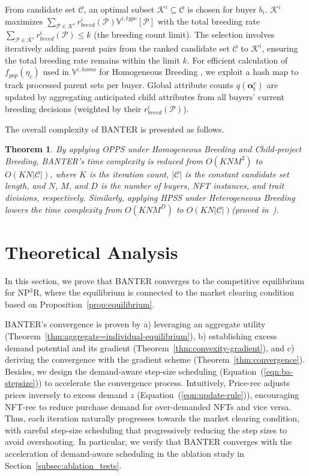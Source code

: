 \documentclass[conference]{IEEEtran}
\theoremstyle{plain}
\newtheorem{theorem}{Theorem}
\begin{document}
    From candidate set $\mathcal{C}$, an optimal subset $\mathcal{K}^i \subseteq \mathcal{C}$ is chosen for buyer $b_i$. $\mathcal{K}^i$ maximizes $\sum_{\mathcal{P}\in \mathcal{K}^i} r_{breed}^i(\mathcal{P})\mathbb{V}^{i, type}\left[\mathcal{P}\right]$ with the total breeding rate $\sum_{\mathcal{P}\in \mathcal{K}^i}r_{breed}^i(\mathcal{P}) \leq k$ (the breeding count limit). The selection involves iteratively adding parent pairs from the ranked candidate set $\mathcal{C}$ to $\mathcal{K}^i$, ensuring the total breeding rate remains within the limit $k$. For efficient calculation of $f_{pop}(\eta_c)$ used in $\mathbb{V}^{i, homo}$ for Homogeneous Breeding , we exploit a hash map to track processed parent sets per buyer. Global attribute counts $q(\bm{\alpha}^c_t)$ are updated by aggregating anticipated child attributes from all buyers' current breeding decisions (weighted by their $r_{breed}^i(\mathcal{P})$).

    The overall complexity of BANTER is presented as follows.

\begin{theorem}
    \label{thm:time-complexity}
        By applying OPPS under Homogeneous Breeding and Child-project Breeding, BANTER's time complexity is reduced from $O(KNM^2)$ to $O(KN|\mathcal{C}|)$, where $K$ is the iteration count, $|\mathcal{C}|$ is the constant candidate set length, and $N$, $M$, and $D$ is the number of buyers, NFT instances, and trait divisions, respectively. Similarly, applying HPSS under Heterogeneous Breeding lowers the time complexity from $O(KNM^D)$ to $O(KN|\mathcal{C}|)$(proved in~\cite{supplementary}). 

\end{theorem}

\section{Theoretical Analysis}
\label{sec:theory}
In this section, we prove that BANTER converges to the competitive equilibrium for NP$^3$R, where the equilibrium is connected to the market clearing condition based on Proposition~\ref{prop:equilibrium}. 

BANTER's convergence is proven by a) leveraging an aggregate utility (Theorem~\ref{thm:aggregate=individual-equilibrium}), b) establishing excess demand potential and its gradient (Theorem~\ref{thm:convexity-gradient}), and c) deriving the convergence with the gradient scheme (Theorem~\ref{thm:convergence}). Besides, we design the demand-aware step-size scheduling (Equation~(\ref{eqn:ba-stepsize})) to accelerate the convergence process. Intuitively, Price-rec adjusts prices inversely to excess demand $z$ (Equation~(\ref{eqn:update-rule})), encouraging NFT-rec to reduce purchase demand for over-demanded NFTs and vice versa. Thus, each iteration naturally progresses towards the market clearing condition, with careful step-size scheduling that progressively reducing the step sizes to avoid overshooting. In particular, we verify that BANTER converges with the acceleration of demand-aware scheduling in the ablation study in Section~\ref{subsec:ablation_tests}.
\end{document}
